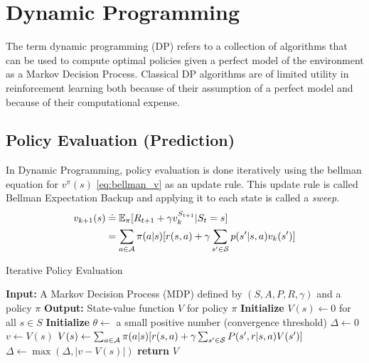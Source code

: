\section{Dynamic Programming \label{sec:dynamic_programming}}
The term dynamic programming (DP) refers to a collection of algorithms that can be used to compute optimal policies given a perfect model
of the environment as a Markov Decision Process. Classical DP algorithms are of limited utility in reinforcement learning both because of their assumption
of a perfect model and because of their computational expense.

\subsection{Policy Evaluation (Prediction)}
In Dynamic Programming, policy evaluation is done iteratively using the bellman equation for $v^\pi(s)$ \eqref{eq:bellman_v} as an update rule.
This update rule is called Bellman Expectation Backup and applying it to each state is called a \textit{sweep}.
\begin{equation*}
    \label{eq:policy_evaluation_update}
    \begin{aligned}
    v_{k+1}(s) &\doteq \mathbb{E}_\pi[R_{t+1} + \gamma v_k^{S_{t+1}} | S_t = s] \\
    &= \sum_{a \in \mathcal{A}} \pi(a|s)[r(s,a) +\gamma \sum_{s' \in \mathcal{S}} p(s'|s,a) v_k(s')]
    \end{aligned}
\end{equation*}

\begin{algorithm}[H]
    \label{alg:iterative_policy_evaluation}
    \caption{Iterative Policy Evaluation}
    \begin{algorithmic}[1]
        \STATE \textbf{Input:} A Markov Decision Process (MDP) defined by $(S, A, P, R, \gamma)$ and a policy $\pi$
        \STATE \textbf{Output:} State-value function $V$ for policy $\pi$
        \STATE \textbf{Initialize} $V(s) \gets 0$ for all $s \in S$
        \STATE \textbf{Initialize} $\theta \gets$ a small positive number (convergence threshold)
        \REPEAT
            \STATE $\Delta \gets 0$
                \STATE $v \gets V(s)$
                \STATE $V(s) \gets \sum_{a \in \mathcal{A}} \pi(a|s) [r(s,a) + \gamma \sum_{s' \in \mathcal{S}} P(s', r | s, a) V(s')]$
                \STATE $\Delta \gets \max(\Delta, |v - V(s)|)$
            \ENDFOR
        \UNTIL{$\Delta < \theta$}
        \STATE \textbf{return} $V$
    \end{algorithmic}
\end{algorithm} 

